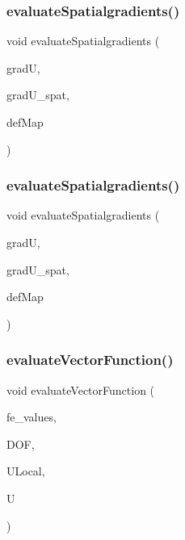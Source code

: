 \subsubsection{\texorpdfstring{evaluate\+Spatialgradients()}{evaluateSpatialgradients()}\hspace{0.1cm}{\footnotesize\ttfamily [1/2]}}
{\footnotesize\ttfamily void evaluate\+Spatialgradients (\begin{DoxyParamCaption}\item[{Table$<$ 2, T $>$ \&}]{gradU,  }\item[{Table$<$ 2, T $>$}]{grad\+U\+\_\+spat,  }\item[{\mbox{\hyperlink{structdeformation_map}{deformation\+Map}}$<$ T, dim $>$ \&}]{def\+Map }\end{DoxyParamCaption})}

\mbox{\label{group___evaluation_functions_ga0b976342d491f6215953e2e65ea6a0de}} 
\subsubsection{\texorpdfstring{evaluate\+Spatialgradients()}{evaluateSpatialgradients()}\hspace{0.1cm}{\footnotesize\ttfamily [2/2]}}
{\footnotesize\ttfamily void evaluate\+Spatialgradients (\begin{DoxyParamCaption}\item[{Table$<$ 3, T $>$ \&}]{gradU,  }\item[{Table$<$ 3, T $>$}]{grad\+U\+\_\+spat,  }\item[{\mbox{\hyperlink{structdeformation_map}{deformation\+Map}}$<$ T, dim $>$ \&}]{def\+Map }\end{DoxyParamCaption})}

\mbox{\label{group___evaluation_functions_gab9e164be1be244df81c932426a4bd513}} 
\subsubsection{\texorpdfstring{evaluate\+Vector\+Function()}{evaluateVectorFunction()}}
{\footnotesize\ttfamily void evaluate\+Vector\+Function (\begin{DoxyParamCaption}\item[{const F\+E\+Values$<$ dim $>$ \&}]{fe\+\_\+values,  }\item[{unsigned int}]{D\+OF,  }\item[{Table$<$ 1, T $>$ \&}]{U\+Local,  }\item[{Table$<$ 2, T $>$ \&}]{U }\end{DoxyParamCaption})}


